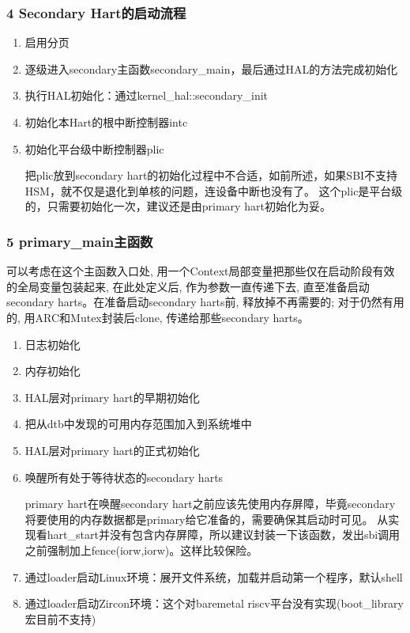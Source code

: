 \documentclass[
8pt, %
]{beamer}
\begin{document}
	\begin{frame}
		\frametitle{4 Secondary Hart的启动流程}
		\begin{enumerate}
			\item 启用分页
			\item 逐级进入secondary主函数secondary\_main，最后通过HAL的方法完成初始化
			\item 执行HAL初始化：通过kernel\_hal::secondary\_init
			\item 初始化本Hart的根中断控制器intc
			\item 初始化平台级中断控制器plic
			\begin{block}{}
				把plic放到secondary hart的初始化过程中不合适，如前所述，如果SBI不支持HSM，就不仅是退化到单核的问题，连设备中断也没有了。
				这个plic是平台级的，只需要初始化一次，建议还是由primary hart初始化为妥。
			\end{block}
		\end{enumerate}
	\end{frame}

	\begin{frame}
		\frametitle{5 primary\_main主函数}
		\begin{block}{}
			可以考虑在这个主函数入口处, 用一个Context局部变量把那些仅在启动阶段有效的全局变量包装起来,
            在此处定义后, 作为参数一直传递下去, 直至准备启动secondary harts。在准备启动secondary harts前,
            释放掉不再需要的; 对于仍然有用的, 用ARC和Mutex封装后clone, 传递给那些secondary harts。
		\end{block}
		\begin{enumerate}
			\item 日志初始化
			\item 内存初始化
			\item HAL层对primary hart的早期初始化
			\item 把从dtb中发现的可用内存范围加入到系统堆中
			\item HAL层对primary hart的正式初始化
			\item 唤醒所有处于等待状态的secondary harts
			\begin{block}{}
				primary hart在唤醒secondary hart之前应该先使用内存屏障，毕竟secondary将要使用的内存数据都是primary给它准备的，需要确保其启动时可见。
				从实现看hart\_start并没有包含内存屏障，所以建议封装一下该函数，发出sbi调用之前强制加上fence(iorw,iorw)。这样比较保险。
			\end{block}
			\item 通过loader启动Linux环境：展开文件系统，加载并启动第一个程序，默认shell
			\item 通过loader启动Zircon环境：这个对baremetal riscv平台没有实现(boot\_library宏目前不支持)
		\end{enumerate}
	\end{frame}
\end{document}
